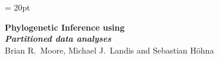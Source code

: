 \documentclass[11pt]{article}
\begin{document}
\renewcommand{\headrulewidth}{0.5pt}
\headsep = 20pt
\lhead{ }
\thispagestyle{plain}
\begin{center}

\textbf{\LARGE Phylogenetic Inference using \RevBayes}\\\vspace{2mm}
\textbf{\it{\Large Partitioned data analyses}}\\\vspace{2mm}
\vspace{1cm}
{\Large Brian R.~Moore, Michael J.~Landis and Sebastian H{\"o}hna}
\vspace{1cm}
\end{center}


\def \ResourcePath {./}
\def \GlobalResourcePath {../}

\end{document}
